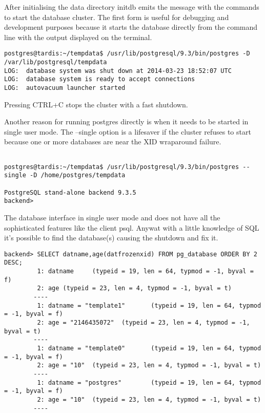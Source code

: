 After initialising the data directory initdb emits the message with the commands to start the 
database cluster. The first form is useful for debugging and development purposes because it starts 
the database directly from the command line with the output displayed on the terminal. 

\begin{verbatim}
postgres@tardis:~/tempdata$ /usr/lib/postgresql/9.3/bin/postgres -D 
/var/lib/postgresql/tempdata
LOG:  database system was shut down at 2014-03-23 18:52:07 UTC
LOG:  database system is ready to accept connections
LOG:  autovacuum launcher started

\end{verbatim}

Pressing CTRL+C stops the cluster with a fast shutdown.\newline

Another reason for running postgres directly is when it needs to be started in single user mode. 
The --single option is a lifesaver if the cluster refuses to start because one or more 
databases are near the XID wraparound failure. 
\begin{verbatim}

postgres@tardis:~/tempdata$ /usr/lib/postgresql/9.3/bin/postgres --single -D /home/postgres/tempdata

PostgreSQL stand-alone backend 9.3.5
backend> 

\end{verbatim}

The database interface in single user mode and does not have all the sophisticated features 
like the client psql. Anywat with a little knowledge of SQL it's possible to find the database(s) 
causing the shutdown and fix it.

\begin{verbatim}
backend> SELECT datname,age(datfrozenxid) FROM pg_database ORDER BY 2 DESC;
         1: datname     (typeid = 19, len = 64, typmod = -1, byval = f)
         2: age (typeid = 23, len = 4, typmod = -1, byval = t)
        ----
         1: datname = "template1"       (typeid = 19, len = 64, typmod = -1, byval = f)
         2: age = "2146435072"  (typeid = 23, len = 4, typmod = -1, byval = t)
        ----
         1: datname = "template0"       (typeid = 19, len = 64, typmod = -1, byval = f)
         2: age = "10"  (typeid = 23, len = 4, typmod = -1, byval = t)
        ----
         1: datname = "postgres"        (typeid = 19, len = 64, typmod = -1, byval = f)
         2: age = "10"  (typeid = 23, len = 4, typmod = -1, byval = t)
        ----

\end{verbatim}

